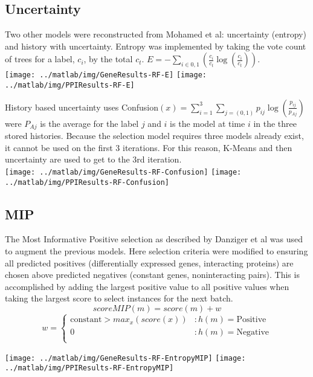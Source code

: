 \documentclass[10pt,a4pape r]{article}
\begin{document}
\subsection{Uncertainty}
Two other models were reconstructed from Mohamed et al: uncertainty (entropy) and history with uncertainty. Entropy was implemented by taking the vote count of trees for a label, $c_i$, by the total $c_t$. $E = -\sum_{i\in 0,1}(\frac{c_i}{c_t}\log(\frac{c_i}{c_t}))$. \\

 \texttt{[image: ../matlab/img/GeneResults-RF-E]} \texttt{[image: ../matlab/img/PPIResults-RF-E]}

 History based uncertainty uses Confusion$(x) = \sum_{i=1}^{3}\sum_{j=(0,1)} p_{ij}\log(\frac{p_{ij}}{p_{Aj}})$ were $P_{Aj}$ is the average for the label $j$ and $i$ is the model at time $i$ in the three stored histories.  Because the selection model requires three models already exist, it cannot be used on the first 3 iterations. For this reason, K-Means and then uncertainty are used to get to the 3rd iteration.\\
 \texttt{[image: ../matlab/img/GeneResults-RF-Confusion]} \texttt{[image: ../matlab/img/PPIResults-RF-Confusion]}


\subsection{MIP}
The Most Informative Positive selection as described by Danziger et al\cite{danziger} was used to augment the previous models. Here selection criteria were modified to ensuring all predicted positives (differentially expressed genes, interacting proteins) are chosen above predicted negatives (constant genes, noninteracting pairs). This is accomplished by adding the largest positive value to all positive values when taking the largest score to select instances for the next batch.
\[ scoreMIP(m) = score(m) +w \]
\[ w = \left\{ \begin{array}{lr}
      \text{constant} > max_{x}(score(x)) &: h(m)= \text{Positive} \\
      0  &: h(m)= \text{Negative} \\
\end{array} \right.
 \]

 \texttt{[image: ../matlab/img/GeneResults-RF-EntropyMIP]} \texttt{[image: ../matlab/img/PPIResults-RF-EntropyMIP]} \\
\end{document}

